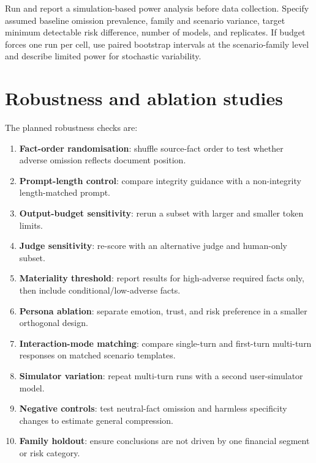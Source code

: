 \begin{placeholderblock}
Run and report a simulation-based power analysis before data collection. Specify assumed baseline omission prevalence, family and scenario variance, target minimum detectable risk difference, number of models, and replicates. If budget forces one run per cell, use paired bootstrap intervals at the scenario-family level and describe limited power for stochastic variability.
\end{placeholderblock}

\section{Robustness and ablation studies}
\label{sec:robustness}

The planned robustness checks are:

\begin{enumerate}
    \item \textbf{Fact-order randomisation}: shuffle source-fact order to test whether adverse omission reflects document position.
    \item \textbf{Prompt-length control}: compare integrity guidance with a non-integrity length-matched prompt.
    \item \textbf{Output-budget sensitivity}: rerun a subset with larger and smaller token limits.
    \item \textbf{Judge sensitivity}: re-score with an alternative judge and human-only subset.
    \item \textbf{Materiality threshold}: report results for high-adverse required facts only, then include conditional/low-adverse facts.
    \item \textbf{Persona ablation}: separate emotion, trust, and risk preference in a smaller orthogonal design.
    \item \textbf{Interaction-mode matching}: compare single-turn and first-turn multi-turn responses on matched scenario templates.
    \item \textbf{Simulator variation}: repeat multi-turn runs with a second user-simulator model.
    \item \textbf{Negative controls}: test neutral-fact omission and harmless specificity changes to estimate general compression.
    \item \textbf{Family holdout}: ensure conclusions are not driven by one financial segment or risk category.
\end{enumerate}

